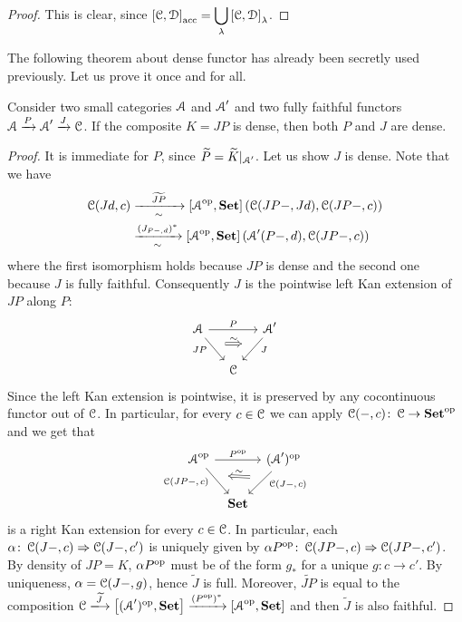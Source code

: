 \documentclass[a4paper,11pt,oneside,openany]{scrbook}
\begin{document}
\begin{proof}
	This is clear, since $\displaystyle\left[\operatorname{\mathcal{C}},\operatorname{\mathcal{D}}\right]_\text{acc}=\bigcup_\lambda\left[\operatorname{\mathcal{C}},\operatorname{\mathcal{D}}\right]_\lambda$.
\end{proof}
The following theorem about dense functor has already been secretly used previously. Let us prove it once and for all. 
\begin{thm}
	Consider two small categories $\operatorname{\mathcal{A}}$ and $\operatorname{\mathcal{A}}'$ and two fully faithful functors $\operatorname{\mathcal{A}}\xrightarrow{P}\operatorname{\mathcal{A}}'\xrightarrow{J}\operatorname{\mathcal{C}}$. If the composite $K=JP$ is dense, then both $P$ and $J$ are dense.
\end{thm}
\begin{proof}
	It is immediate for $P$, since $\widetilde{P}=\widetilde{K}|_{\operatorname{\mathcal{A}}'}$. Let us show $J$ is dense. Note that we have 
	\begin{align*}
	\operatorname{\mathcal{C}}(Jd,c)&\xrightarrow[\sim]{\hspace*{4mm}\widetilde{JP}\hspace*{4mm}}\left[\operatorname{\mathcal{A}}^{\operatorname{\text{op}}}, {\normalfont\textbf{Set}}\right](\operatorname{\mathcal{C}}(JP-,Jd),\operatorname{\mathcal{C}}(JP-,c))\\
	&\xrightarrow[\sim]{(J_{P-,d})^*}\left[\operatorname{\mathcal{A}}^{\operatorname{\text{op}}}, {\normalfont\textbf{Set}}\right](\operatorname{\mathcal{A}}'(P-,d),\operatorname{\mathcal{C}}(JP-,c))
	\end{align*}
	where the first isomorphism holds because $JP$ is dense and the second one because $J$ is fully faithful. Consequently $J$ is the pointwise left Kan extension of $JP$ along $P$:
	\[
	\begin{tikzcd}[column sep=small]
	\A\ar[rr, "P"]\ar[dr, swap, "JP" near start, ""{name=JP, below}]
	&& \A'\ar[dl, "J" near start, ""{name=J, below}] \\
	& \C
	\ar[Rightarrow, shorten <= .6em, shorten >= .6em, shift left=1.5ex, "\sim", from=JP, to=J] 
	\end{tikzcd}
	\]
	Since the left Kan extension is pointwise, it is preserved by any cocontinuous functor out of $\operatorname{\mathcal{C}}$. In particular, for every $c\in\operatorname{\mathcal{C}}$ we can apply $\operatorname{\mathcal{C}}(-,c)\colon\operatorname{\mathcal{C}}\to{\normalfont\textbf{Set}}^{\operatorname{\text{op}}}$ and we get that
	\[
	\begin{tikzcd}[column sep=tiny]
	\A^{\op}\ar[rr, "P^{\op}"]\ar[dr, swap, "\C(JP-\text{, }\hspace*{-.5mm}c)"near start, ""{name=JP, below}]
	&& (\A')^{\op}\ar[dl, "\C(J-\text{, }\hspace*{-.5mm} c)" near start, ""{name=J, below}] \\
	& \Set
	\ar[Leftarrow, shorten <= .6em, shorten >= .6em, shift left=1.5ex, "\sim", from=JP, to=J] 
	\end{tikzcd}
	\]
	is a right Kan extension for every $c\in\operatorname{\mathcal{C}}$. In particular, each $\alpha\colon\operatorname{\mathcal{C}}(J-,c)\Rightarrow\operatorname{\mathcal{C}}(J-,c')$ is uniquely given by $\alpha P^{\operatorname{\text{op}}}\colon\operatorname{\mathcal{C}}(JP-,c)\Rightarrow\operatorname{\mathcal{C}}(JP-,c')$. By density of $JP=K$, $\alpha P^{\operatorname{\text{op}}}$ must be of the form $g_*$ for a unique $g\colon c\to c'$. By uniqueness, $\alpha=\operatorname{\mathcal{C}}(J-,g)$, hence $\widetilde{J}$ is full. Moreover, $\widetilde{JP}$ is equal to the composition $\C\xlongrightarrow{\widetilde{J}} \left[(\A')^{\op},\Set\right]\xrightarrow{(P^{\op})^*}\left[\A^{\op},\Set\right]$ and then $\widetilde{J}$ is also faithful.
\end{proof}
\end{document}
